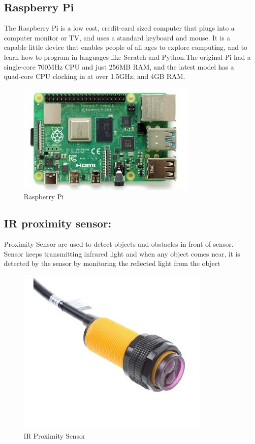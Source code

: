 \documentclass[a4paper,12pt]{report}
\begin{document}
\subsection{Raspberry Pi}
The Raspberry Pi is a low cost, credit-card sized computer that plugs into a computer
monitor or TV, and uses a standard keyboard and mouse. It is a capable little device that
enables people of all ages to explore computing, and to learn how to program in languages
like Scratch and Python.The original Pi had a single-core 700MHz CPU and just 256MB
RAM, and the latest model has a quad-core CPU clocking in at over 1.5GHz, and 4GB
RAM.
\begin{figure}[h] %
   \begin{center}
   \includegraphics[scale=1]{rb pi.jpg}
   \caption{Raspberry Pi}
  \end{center}
  \end{figure}
\pagebreak
\subsection{IR proximity sensor:}
Proximity Sensor are used to detect objects and obstacles in front of sensor. Sensor keeps
transmitting infrared light and when any object comes near, it is detected by the sensor by
monitoring the reflected light from the object
\begin{figure}[h] %
   \begin{center}
   \includegraphics[scale=0.5]{ir sensor.jpg}
   \caption{IR Proximity Sensor}
  \end{center}
  \end{figure}
\end{document}
